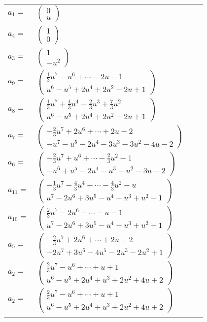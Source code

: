 \documentclass[1p]{elsarticle_modified}
\theoremstyle{definition}
\begin{document}
\begin{tabular}{m{7pt} m{180pt} m{7pt} m{180pt} }
\flushright $a_{1}=$&$\begin{pmatrix}0\\u\end{pmatrix}$ \\
\flushright $a_{4}=$&$\begin{pmatrix}1\\0\end{pmatrix}$ \\
\flushright $a_{3}=$&$\begin{pmatrix}1\\- u^2\end{pmatrix}$ \\
\flushright $a_{9}=$&$\begin{pmatrix}\frac{1}{3} u^7- u^6+\cdots-2 u-1\\u^6- u^5+2 u^4+2 u^2+2 u+1\end{pmatrix}$ \\
\flushright $a_{8}=$&$\begin{pmatrix}\frac{1}{3} u^7+\frac{4}{3} u^4-\frac{2}{3} u^3+\frac{7}{3} u^2\\u^6- u^5+2 u^4+2 u^2+2 u+1\end{pmatrix}$ \\
\flushright $a_{7}=$&$\begin{pmatrix}-\frac{2}{3} u^7+2 u^6+\cdots+2 u+2\\- u^7- u^5-2 u^4-3 u^3-3 u^2-4 u-2\end{pmatrix}$ \\
\flushright $a_{6}=$&$\begin{pmatrix}-\frac{2}{3} u^7+u^6+\cdots-\frac{2}{3} u^2+1\\- u^6+u^5-2 u^4- u^3- u^2-3 u-2\end{pmatrix}$ \\
\flushright $a_{11}=$&$\begin{pmatrix}-\frac{1}{3} u^7-\frac{4}{3} u^4+\cdots-\frac{4}{3} u^2- u\\u^7-2 u^6+3 u^5- u^4+u^3+u^2-1\end{pmatrix}$ \\
\flushright $a_{10}=$&$\begin{pmatrix}\frac{2}{3} u^7-2 u^6+\cdots- u-1\\u^7-2 u^6+3 u^5- u^4+u^3+u^2-1\end{pmatrix}$ \\
\flushright $a_{5}=$&$\begin{pmatrix}-\frac{2}{3} u^7+2 u^6+\cdots+2 u+2\\-2 u^7+3 u^6-4 u^5-2 u^3-2 u^2+1\end{pmatrix}$ \\
\flushright $a_{2}=$&$\begin{pmatrix}\frac{2}{3} u^7- u^6+\cdots+u+1\\u^6- u^5+2 u^4+u^3+2 u^2+4 u+2\end{pmatrix}$\\ \flushright $a_{2}=$&$\begin{pmatrix}\frac{2}{3} u^7- u^6+\cdots+u+1\\u^6- u^5+2 u^4+u^3+2 u^2+4 u+2\end{pmatrix}$\\&\end{tabular}
\end{document}
